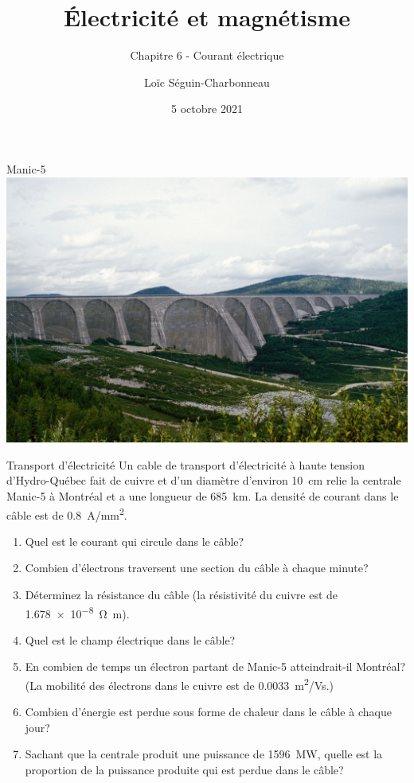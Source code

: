 \documentclass{beamer}
\title{Électricité et magnétisme}
\subtitle{Chapitre 6 - Courant électrique}
\date{5 octobre 2021}
\author{Loïc Séguin-Charbonneau}
\institute{Cégep Édouard-Montpetit}
\begin{document}
\maketitle


\begin{frame}{Manic-5}
  \includegraphics[width=\textwidth]{figures/Manic-5.jpg}
\end{frame}


\begin{frame}{Transport d'électricité}
Un cable de transport d'électricité à haute tension d'Hydro-Québec fait de
cuivre et d'un diamètre d'environ \SI{10}{cm} relie la centrale Manic-5 à
Montréal et a une longueur de \SI{685}{km}. La densité de courant dans le câble
est de \SI{0.8}{A/mm^2}.

\begin{enumerate}
  \item Quel est le courant qui circule dans le câble?
  \item Combien d'électrons traversent une section du câble à chaque minute?
  \item Déterminez la résistance du câble (la résistivité du cuivre est de
    \SI{1.678e-8}{\ohm\meter}).
  \item Quel est le champ électrique dans le câble?
  \item En combien de temps un électron partant de Manic-5 atteindrait-il
    Montréal? (La
    mobilité des électrons dans le cuivre est de \SI{0.0033}{m^2/Vs}.)
  \item Combien d'énergie est perdue sous forme de chaleur dans le câble à
    chaque jour?
  \item Sachant que la centrale produit une puissance de \SI{1596}{MW}, quelle
    est la proportion de la puissance produite qui est perdue dans le câble?
\end{enumerate}
\end{frame}
\end{document}
